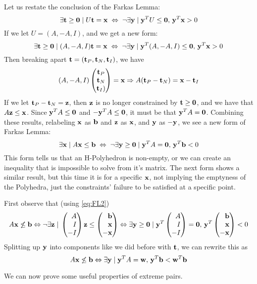 Let us restate the conclusion of the Farkas Lemma:
\newcommand{\xor}{\;\Leftrightarrow\;\neg}
\[ \exists \t\geq\0 \st U\t = \x \xor \exists \y\st \y^TU\leq\0,\, \y^T\x > 0 \]
If we let $U = (A,-A,I)$, and  we get a new form:
\[ \exists \t \geq\0 \st (A,-A,I)\t = \x \xor \exists \y\st \y^T(A,-A,I)\leq\0,\, \y^T\x > 0 \]
Then breaking apart $\mathbf{t} = (\mathbf{t}_P,\mathbf{t}_N,\mathbf{t}_I)$, we have
\[ (A,-A,I)\begin{pmatrix}\mathbf{t}_P\\ \mathbf{t}_N\\ \mathbf{t}_I)\end{pmatrix} = \mathbf{x} \Rightarrow 
        A(\mathbf{t}_P - \mathbf{t}_N) = \mathbf{x} - \mathbf{t}_I \]
If we let $\mathbf{t}_P - \mathbf{t}_N = \mathbf{z}$, then $\mathbf{z}$ is no longer constrained by $\mathbf{t} \geq\mathbf{0}$, and we have that $A\mathbf{z} \leq \mathbf{x}$.  Since $\mathbf{y}^T A \leq \mathbf{0}$ and $-\mathbf{y}^T A\leq \mathbf{0}$, it must be that $\mathbf{y}^T A = \mathbf{0}$.  Combining these results, relabeling $\mathbf{x}$ as $\mathbf{b}$ and $\mathbf{z}$ as $\mathbf{x}$, and $\mathbf{y}$ as $-\mathbf{y}$, we see a new form of Farkas Lemma:
\begin{equation} \label{eq:FL2}
  \exists \x \st A\x \leq \b \xor \exists \y\geq\0 \st \y^TA = \0,\, \y^T\b < 0
\end{equation}
This form tells us that an H-Polyhedron is non-empty, or we can create an inequality that is impossible to solve from it's matrix.  The next form shows a similar result, but this time it is for a specific $\mathbf{x}$, not implying the emptyness of the Polyhedra, just the constraints' failure to be satisfied at a specific point.  

First observe that (using \eqref{eq:FL2})
\[ A\x \not\leq \b \Leftrightarrow \neg \exists \z\st 
  \pmb A\\I\\-I\pme \z \leq \pmb \b\\ \x\\ -\x \pme \Leftrightarrow
  \exists \y\geq\0\st \y^T\pmb A\\I\\-I\pme =\0,\, \y^T\pmb \b\\ \x\\ -\x \pme < 0\]
Splitting up $\mathbf{y}$ into components like we did before with $\mathbf{t}$, we can rewrite this as
\begin{equation} \label{eq:FL3}
  A\mathbf{x} \not\leq \mathbf{b} \Leftrightarrow \exists \mathbf{y}\;|\; \mathbf{y}^T A = \mathbf{w},\, \mathbf{y}^T \mathbf{b} < \mathbf{w}^T\mathbf{b}
\end{equation}

We can now prove some useful properties of extreme pairs.

